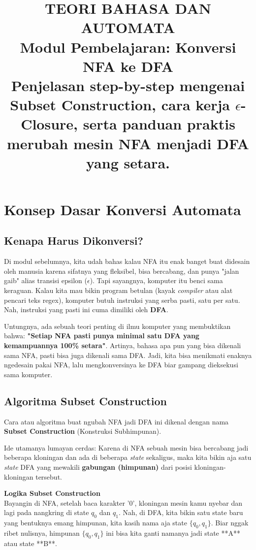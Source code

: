 \documentclass[12pt,a4paper]{article}
\title{
  {\LARGE\bfseries TEORI BAHASA DAN AUTOMATA}\\[0.5em]
  {\large Modul Pembelajaran: Konversi NFA ke DFA}\\[0.8em]
  {\normalsize Penjelasan step-by-step mengenai Subset Construction, cara kerja $\epsilon$-Closure, serta panduan praktis merubah mesin NFA menjadi DFA yang setara.}
}
\author{}
\date{}
\begin{document}
\maketitle
\thispagestyle{fancy}
\tableofcontents
\newpage


\section{Konsep Dasar Konversi Automata}

\subsection{Kenapa Harus Dikonversi?}
Di modul sebelumnya, kita udah bahas kalau NFA itu enak banget buat didesain oleh manusia karena sifatnya yang fleksibel, bisa bercabang, dan punya "jalan gaib" alias transisi epsilon ($\epsilon$). Tapi sayangnya, komputer itu benci sama keraguan. Kalau kita mau bikin program betulan (kayak \textit{compiler} atau alat pencari teks regex), komputer butuh instruksi yang serba pasti, satu per satu. Nah, instruksi yang pasti ini cuma dimiliki oleh \textbf{DFA}.

Untungnya, ada sebuah teori penting di ilmu komputer yang membuktikan bahwa: \textbf{"Setiap NFA pasti punya minimal satu DFA yang kemampuannya 100\% setara"}. Artinya, bahasa apa pun yang bisa dikenali sama NFA, pasti bisa juga dikenali sama DFA. Jadi, kita bisa menikmati enaknya ngedesain pakai NFA, lalu mengkonversinya ke DFA biar gampang dieksekusi sama komputer.

\subsection{Algoritma Subset Construction}
Cara atau algoritma buat ngubah NFA jadi DFA ini dikenal dengan nama \textbf{Subset Construction} (Konstruksi Subhimpunan). 

Ide utamanya lumayan cerdas: Karena di NFA sebuah mesin bisa bercabang jadi beberapa kloningan dan ada di beberapa \textit{state} sekaligus, maka kita bikin aja satu \textit{state} DFA yang mewakili \textbf{gabungan (himpunan)} dari posisi kloningan-kloningan tersebut.

\begin{notebox}
\textbf{Logika Subset Construction} \\
Bayangin di NFA, setelah baca karakter '0', kloningan mesin kamu nyebar dan lagi pada nangkring di state $q_0$ dan $q_1$. Nah, di DFA, kita bikin satu state baru yang bentuknya emang himpunan, kita kasih nama aja state $\{q_0, q_1\}$. Biar nggak ribet nulisnya, himpunan $\{q_0, q_1\}$ ini bisa kita ganti namanya jadi state **A** atau state **B**.
\end{notebox}
\end{document}
